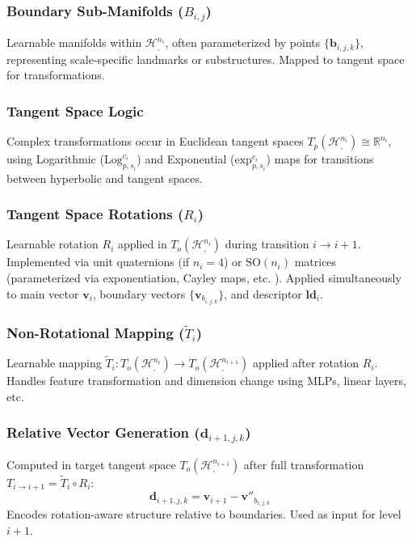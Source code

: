 \documentclass[11pt, twoside]{article} %
\newcommand{\HypSpace}[3]{\mathcal{H}^{#1}_{#2, #3}} %
\newcommand{\R}{\mathbb{R}} %
\newcommand{\SO}[1]{\text{SO}(#1)} %
\begin{document}
\subsubsection{Boundary Sub-Manifolds ($B_{i,j}$)}
\label{ssubsec:boundary_manifolds}
Learnable manifolds within $\HypSpace{n_i}{}{}$, often parameterized by points $\{\mathbf{b}_{i,j,k}\}$, representing scale-specific landmarks or substructures. Mapped to tangent space for transformations.

\subsubsection{Tangent Space Logic}
\label{ssubsec:tangent_space}
Complex transformations occur in Euclidean tangent spaces $T_p(\HypSpace{n_i}{}{}) \cong \R^{n_i}$, using Logarithmic ($\text{Log}^{c_i}_{p,s_i}$) and Exponential ($\text{exp}^{c_i}_{p,s_i}$) maps \cite{KochurovEtAl2020} for transitions between hyperbolic and tangent spaces.

\subsubsection{Tangent Space Rotations ($R_i$)}
\label{ssubsec:tangent_rotation}
Learnable rotation $R_i$ applied in $T_o(\HypSpace{n_i}{}{})$ during transition $i \rightarrow i+1$. Implemented via unit quaternions (if $n_i=4$) or $\SO{n_i}$ matrices (parameterized via exponentiation, Cayley maps, etc. \cite{MhammediEtAl2017}). Applied simultaneously to main vector $\mathbf{v}_i$, boundary vectors $\{\mathbf{v}_{b_{i,j,k}}\}$, and descriptor $\mathbf{ld}_i$.

\subsubsection{Non-Rotational Mapping ($\tilde{T}_i$)}
\label{ssubsec:nonrot_mapping}
Learnable mapping $\tilde{T}_i: T_o(\HypSpace{n_i}{}{}) \rightarrow T_o(\HypSpace{n_{i+1}}{}{})$ applied after rotation $R_i$. Handles feature transformation and dimension change using MLPs, linear layers, etc.

\subsubsection{Relative Vector Generation ($\mathbf{d}_{i+1, j, k}$)}
\label{ssubsec:relative_vectors}
Computed in target tangent space $T_o(\HypSpace{n_{i+1}}{}{})$ after full transformation $T_{i \rightarrow i+1} = \tilde{T}_i \circ R_i$:
\begin{equation}
    \mathbf{d}_{i+1, j, k} = \mathbf{v}_{i+1} - \mathbf{v}''_{b_{i,j,k}}
\end{equation}
Encodes rotation-aware structure relative to boundaries. Used as input for level $i+1$.
\end{document}
